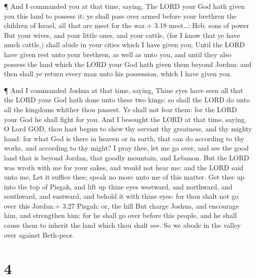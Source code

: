  ¶ And I commanded you at that time, saying, The LORD your
God hath given you this land to possess it: ye shall pass over armed
before your brethren the children of Israel, all that are meet for the
war.+ 3.18 meet\ldots: Heb. sons of power  But your wives,
and your little ones, and your cattle, (for I know that ye have much
cattle,) shall abide in your cities which I have given you;
 Until the LORD have given rest unto your brethren, as well
as unto you, and until they also possess the land which the LORD your
God hath given them beyond Jordan: and then shall ye return every man
unto his possession, which I have given you.

 ¶ And I commanded Joshua at that time, saying, Thine eyes
have seen all that the LORD your God hath done unto these two kings: so
shall the LORD do unto all the kingdoms whither thou passest.
 Ye shall not fear them: for the LORD your God he shall
fight for you.  And I besought the LORD at that time,
saying,  O Lord GOD, thou hast begun to shew thy servant
thy greatness, and thy mighty hand: for what God is there in heaven or
in earth, that can do according to thy works, and according to thy
might?  I pray thee, let me go over, and see the good land
that is beyond Jordan, that goodly mountain, and Lebanon. 
But the LORD was wroth with me for your sakes, and would not hear me:
and the LORD said unto me, Let it suffice thee; speak no more unto me of
this matter.  Get thee up into the top of Pisgah, and lift
up thine eyes westward, and northward, and southward, and eastward, and
behold it with thine eyes: for thou shalt not go over this Jordan.+ 3.27
Pisgah: or, the hill  But charge Joshua, and encourage him,
and strengthen him: for he shall go over before this people, and he
shall cause them to inherit the land which thou shalt see. 
So we abode in the valley over against Beth-peor.

\hypertarget{section-3}{%
\section{4}\label{section-3}}

